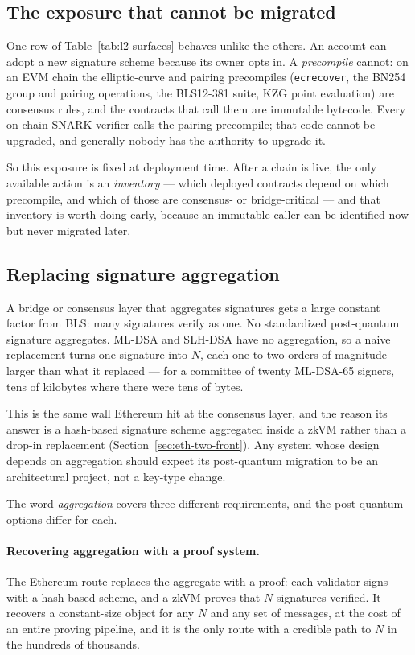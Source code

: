 \subsection{The exposure that cannot be migrated}
One row of Table~\ref{tab:l2-surfaces} behaves unlike the others. An account can
adopt a new signature scheme because its owner opts in. A \emph{precompile}
cannot: on an EVM chain the elliptic-curve and pairing precompiles
(\texttt{ecrecover}, the BN254 group and pairing operations, the BLS12-381 suite,
KZG point evaluation) are consensus rules, and the contracts that call them are
immutable bytecode. Every on-chain SNARK verifier calls the pairing precompile;
that code cannot be upgraded, and generally nobody has the authority to upgrade
it.

So this exposure is fixed at deployment time. After a chain is live, the only
available action is an \emph{inventory} --- which deployed contracts depend on
which precompile, and which of those are consensus- or bridge-critical --- and
that inventory is worth doing early, because an immutable caller can be
identified now but never migrated later.

\subsection{Replacing signature aggregation}
A bridge or consensus layer that aggregates signatures gets a large constant
factor from BLS: many signatures verify as one. No standardized post-quantum
signature aggregates. ML-DSA and SLH-DSA have no aggregation, so a naive
replacement turns one signature into $N$, each one to two orders of magnitude
larger than what it replaced --- for a committee of twenty ML-DSA-65 signers,
tens of kilobytes where there were tens of bytes.

This is the same wall Ethereum hit at the consensus layer, and the reason its
answer is a hash-based signature scheme aggregated inside a zkVM rather than a
drop-in replacement (Section~\ref{sec:eth-two-front}). Any system whose design
depends on aggregation should expect its post-quantum migration to be an
architectural project, not a key-type change.

The word \emph{aggregation} covers three different requirements, and the
post-quantum options differ for each.

\paragraph{Recovering aggregation with a proof system.}
The Ethereum route replaces the aggregate with a proof: each validator signs
with a hash-based scheme, and a zkVM proves that $N$ signatures verified. It
recovers a constant-size object for any $N$ and any set of messages, at the cost
of an entire proving pipeline, and it is the only route with a credible path to
$N$ in the hundreds of thousands.

